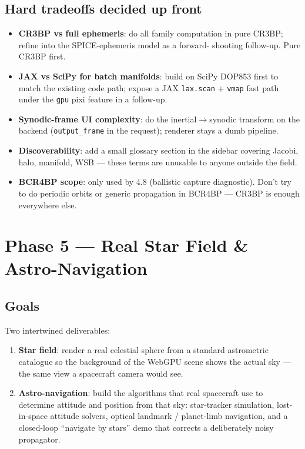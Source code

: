 \documentclass[11pt, a4paper]{article}
\begin{document}
\subsection{Hard tradeoffs decided up front}

\begin{itemize}[leftmargin=*]
  \item \textbf{CR3BP vs full ephemeris}: do all family computation in
        pure CR3BP; refine into the SPICE-ephemeris model as a forward-
        shooting follow-up. Pure CR3BP first.
  \item \textbf{JAX vs SciPy for batch manifolds}: build on SciPy DOP853
        first to match the existing code path; expose a JAX
        \texttt{lax.scan} + \texttt{vmap} fast path under the \texttt{gpu}
        pixi feature in a follow-up.
  \item \textbf{Synodic-frame UI complexity}: do the inertial$\to$synodic
        transform on the backend (\texttt{output\_frame} in the request);
        renderer stays a dumb pipeline.
  \item \textbf{Discoverability}: add a small glossary section in the
        sidebar covering Jacobi, halo, manifold, WSB --- these terms are
        unusable to anyone outside the field.
  \item \textbf{BCR4BP scope}: only used by 4.8 (ballistic capture
        diagnostic). Don't try to do periodic orbits or generic
        propagation in BCR4BP --- CR3BP is enough everywhere else.
\end{itemize}

\newpage
\section{Phase 5 — Real Star Field \& Astro-Navigation}

\subsection{Goals}

Two intertwined deliverables:

\begin{enumerate}[leftmargin=*]
  \item \textbf{Star field}: render a real celestial sphere from a standard
        astrometric catalogue so the background of the WebGPU scene shows
        the actual sky --- the same view a spacecraft camera would see.
  \item \textbf{Astro-navigation}: build the algorithms that real
        spacecraft use to determine attitude and position from that sky:
        star-tracker simulation, lost-in-space attitude solvers, optical
        landmark / planet-limb navigation, and a closed-loop ``navigate by
        stars'' demo that corrects a deliberately noisy propagator.
\end{enumerate}
\end{document}
